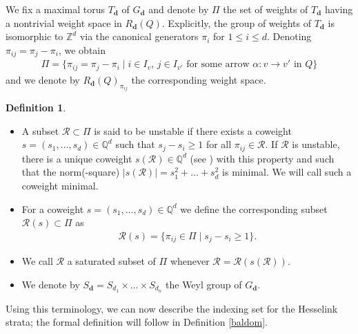 \documentclass[10pt,a4paper]{amsart}
\newcommand{\R}{\mathcal{R}}
\numberwithin{equation}{section}
\theoremstyle{definition}
\newtheorem{Definition}[Theorem]{Definition}
\begin{document}
We fix a maximal torus $T_{\mathbf{d}}$ of $G_{\mathbf{d}}$ and denote by $\Pi$ the set of weights of $T_{\mathbf{d}}$ having a nontrivial weight space in $R_{\mathbf{d}}(Q)$. Explicitly, the group of weights of $T_{\mathbf{d}}$ is isomorphic to $\mathbb{Z}^d$ via the canonical generators $\pi_i$ for $1 \leq i \leq d$. Denoting $\pi_{ij} = \pi_j - \pi_i$, we obtain
 \begin{align*}
 \Pi = \{\pi_{ij} = \pi_j - \pi_i \mid i \in I_v,\, j \in I_{v'} \text{ for some arrow } \alpha\colon v \rightarrow v' \text{ in } Q\}
 \end{align*}
 and we denote by $R_{\mathbf{d}}(Q)_{\pi_{ij}}$ the corresponding weight space.
\begin{Definition}\label{subsetR}\quad
\begin{itemize}\itemsep=0pt
\item[(a)] A subset $\R \subset \Pi$ is said to be unstable if there exists a coweight $s=(s_1, \dots, s_d) \in \mathbb{Q}^d$ such that $s_j -s_i \geq 1$ for all $\pi_{ij} \in \R$.
If $\R$ is unstable, there is a unique coweight $s(\R) \in \mathbb{Q}^d$ (see \cite[Lemma 6.2]{LBB}) with this property and such that the norm(-square) $|s(\R)| = s_1^2 + \dots + s_d^2$ is minimal. We will call such a coweight minimal.

\item[(b)] For a coweight $s=(s_1, \dots, s_d) \in \mathbb{Q}^d$ we define the corresponding subset $\R(s) \subset \Pi$ as
\begin{align*}
 \R(s) = \{\pi_{ij} \in \Pi \mid s_j - s_i \geq 1\}.
\end{align*}

\item[(c)] We call $\R$ a saturated subset of $\Pi$ whenever $\R = \R(s(\R))$.

\item[(d)] We denote by $S_{\mathbf{d}} = S_{d_1} \times \dots \times S_{d_n}$ the Weyl group of $G_{\mathbf{d}}$.
\end{itemize}
\end{Definition}

Using this terminology, we can now describe the indexing set for the Hesselink strata; the formal definition will follow in Definition \ref{baldom}.
\end{document}
